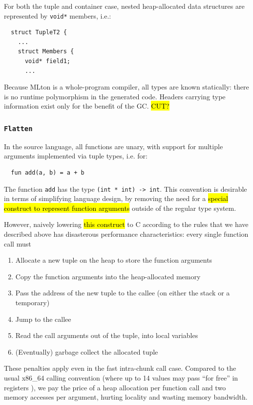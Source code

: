\documentclass[leqno,11pt]{article}
\begin{document}
For both the tuple and container case, nested heap-allocated data structures are
represented by \texttt{void*} members, i.e.:
\begin{verbatim}
  struct TupleT2 {
    ...
    struct Members {
      void* field1;
      ...
\end{verbatim}
Because MLton is a whole-program compiler, all types are known statically: there
is no runtime polymorphism in the generated code. Headers carrying type
information exist only for the benefit of the GC. \hl{CUT?}


\subsubsection{\texttt{Flatten}}
In the source language, all functions are unary, with support for multiple
arguments implemented via tuple types, i.e. for:
\begin{verbatim}
  fun add(a, b) = a + b
\end{verbatim}
The function \texttt{add} has the type \texttt{(int * int) -> int}. This
convention is desirable in terms of simplifying language design, by removing the
need for a \hl{special construct to represent function arguments} outside of the
regular type system.

However, naively lowering \hl{this construct} to C according to the rules that
we have described above has disasterous performance characteristics: every
single function call must
\begin{enumerate}
\item Allocate a new tuple on the heap to store the function arguments
\item Copy the function arguments into the heap-allocated memory
\item Pass the address of the new tuple to the callee (on either the stack or a temporary)
\item Jump to the callee
\item Read the call arguments out of the tuple, into local variables
\item (Eventually) garbage collect the allocated tuple
\end{enumerate}
These penalties apply even in the fast intra-chunk call case. Compared to the
usual x86\_64 calling convention (where up to 14 values may pass ``for free'' in
registers \cite{amd64-abi}), we pay the price of a heap allocation per function
call and two memory accesses per argument, hurting locality and wasting memory
bandwidth.
\end{document}
